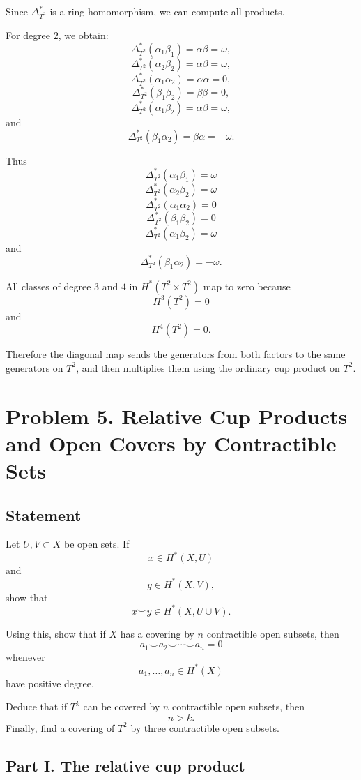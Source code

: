 \documentclass[12pt,a4paper]{article}
\theoremstyle{notespace}
\begin{document}
Since \(\Delta_{T^2}^*\) is a ring homomorphism, we can compute all products.

For degree \(2\), we obtain:
\[
\Delta_{T^2}^*(\alpha_1\beta_1)
=
\alpha\beta
=
\omega,
\]
\[
\Delta_{T^2}^*(\alpha_2\beta_2)
=
\alpha\beta
=
\omega,
\]
\[
\Delta_{T^2}^*(\alpha_1\alpha_2)
=
\alpha\alpha
=
0,
\]
\[
\Delta_{T^2}^*(\beta_1\beta_2)
=
\beta\beta
=
0,
\]
\[
\Delta_{T^2}^*(\alpha_1\beta_2)
=
\alpha\beta
=
\omega,
\]
and
\[
\Delta_{T^2}^*(\beta_1\alpha_2)
=
\beta\alpha
=
-\omega.
\]

Thus
\[
\boxed{
	\Delta_{T^2}^*(\alpha_1\beta_1)=\omega
}
\]
\[
\boxed{
	\Delta_{T^2}^*(\alpha_2\beta_2)=\omega
}
\]
\[
\boxed{
	\Delta_{T^2}^*(\alpha_1\alpha_2)=0
}
\]
\[
\boxed{
	\Delta_{T^2}^*(\beta_1\beta_2)=0
}
\]
\[
\boxed{
	\Delta_{T^2}^*(\alpha_1\beta_2)=\omega
}
\]
and
\[
\boxed{
	\Delta_{T^2}^*(\beta_1\alpha_2)=-\omega.
}
\]

All classes of degree \(3\) and \(4\) in \(H^*(T^2\times T^2)\) map to zero because
\[
H^3(T^2)=0
\]
and
\[
H^4(T^2)=0.
\]

Therefore the diagonal map sends the generators from both factors to the same generators on \(T^2\), and then multiplies them using the ordinary cup product on \(T^2\).

\section{Problem 5. Relative Cup Products and Open Covers by Contractible Sets}

\subsection*{Statement}

Let \(U,V\subset X\) be open sets. If
\[
x\in H^*(X,U)
\]
and
\[
y\in H^*(X,V),
\]
show that
\[
x\smile y\in H^*(X,U\cup V).
\]

Using this, show that if \(X\) has a covering by \(n\) contractible open subsets, then
\[
a_1\smile a_2\smile \cdots \smile a_n=0
\]
whenever
\[
a_1,\dots,a_n\in H^*(X)
\]
have positive degree.

Deduce that if \(T^k\) can be covered by \(n\) contractible open subsets, then
\[
n>k.
\]
Finally, find a covering of \(T^2\) by three contractible open subsets.

\subsection*{Part I. The relative cup product}
\end{document}
